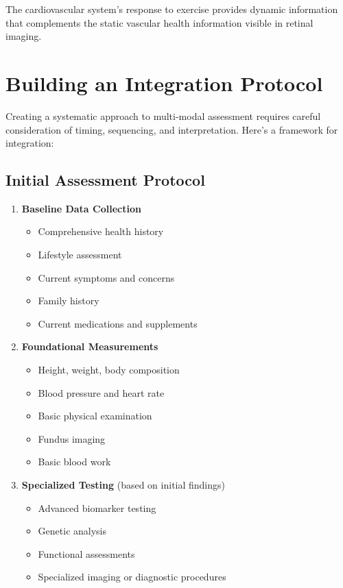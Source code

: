 \documentclass[
  Letterpaper,
]{scrbook}
\providecommand{\tightlist}{%
  \setlength{\itemsep}{0pt}\setlength{\parskip}{0pt}}\usepackage{longtable,booktabs,array}
\begin{document}
The cardiovascular system's response to exercise provides dynamic
information that complements the static vascular health information
visible in retinal imaging.

\section{Building an Integration
Protocol}\label{building-an-integration-protocol}

Creating a systematic approach to multi-modal assessment requires
careful consideration of timing, sequencing, and interpretation. Here's
a framework for integration:

\subsection{Initial Assessment
Protocol}\label{initial-assessment-protocol}

\begin{enumerate}
\def\labelenumi{\arabic{enumi}.}
\tightlist
\item
  \textbf{Baseline Data Collection}

  \begin{itemize}
  \tightlist
  \item
    Comprehensive health history
  \item
    Lifestyle assessment
  \item
    Current symptoms and concerns
  \item
    Family history
  \item
    Current medications and supplements
  \end{itemize}
\item
  \textbf{Foundational Measurements}

  \begin{itemize}
  \tightlist
  \item
    Height, weight, body composition
  \item
    Blood pressure and heart rate
  \item
    Basic physical examination
  \item
    Fundus imaging
  \item
    Basic blood work
  \end{itemize}
\item
  \textbf{Specialized Testing} (based on initial findings)

  \begin{itemize}
  \tightlist
  \item
    Advanced biomarker testing
  \item
    Genetic analysis
  \item
    Functional assessments
  \item
    Specialized imaging or diagnostic procedures
  \end{itemize}
\end{enumerate}
\end{document}
